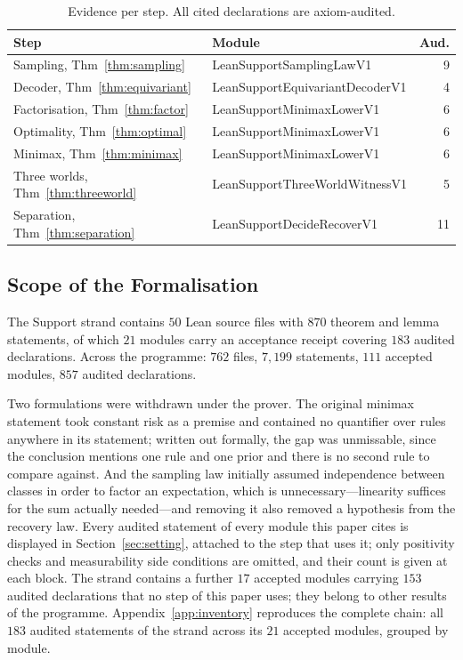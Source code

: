 \documentclass[conference]{IEEEtran}
\theoremstyle{definition}
\newcommand{\lean}[1]{\textsf{\footnotesize #1}}
\begin{document}
\begin{table}[htbp]
\caption{Evidence per step. All cited declarations are axiom-audited.}
\label{tab:inventory}
\centering\footnotesize\setlength{\tabcolsep}{3pt}
\begin{tabular}{@{}llr@{}}
\toprule
Step & Module & Aud. \\
\midrule
Sampling, Thm~\ref{thm:sampling}      & \lean{LeanSupportSamplingLawV1}        & 9 \\
Decoder, Thm~\ref{thm:equivariant}    & \lean{LeanSupportEquivariantDecoderV1} & 4 \\
Factorisation, Thm~\ref{thm:factor}   & \lean{LeanSupportMinimaxLowerV1}       & 6 \\
Optimality, Thm~\ref{thm:optimal}     & \lean{LeanSupportMinimaxLowerV1}       & 6 \\
Minimax, Thm~\ref{thm:minimax}        & \lean{LeanSupportMinimaxLowerV1}       & 6 \\
Three worlds, Thm~\ref{thm:threeworld}& \lean{LeanSupportThreeWorldWitnessV1}  & 5 \\
Separation, Thm~\ref{thm:separation}  & \lean{LeanSupportDecideRecoverV1}      & 11 \\
\bottomrule
\end{tabular}
\end{table}

\subsection{Scope of the Formalisation}

The Support strand contains $50$ Lean source files with $870$ theorem and lemma statements,
of which $21$ modules carry an acceptance receipt covering $183$ audited declarations. Across
the programme: $762$ files, $7{,}199$ statements, $111$ accepted modules, $857$ audited
declarations.

Two formulations were withdrawn under the prover. The original minimax statement took constant
risk as a premise and contained no quantifier over rules anywhere in its statement; written out
formally, the gap was unmissable, since the conclusion mentions one rule and one prior and
there is no second rule to compare against. And the sampling law initially assumed independence
between classes in order to factor an expectation, which is unnecessary---linearity suffices
for the sum actually needed---and removing it also removed a hypothesis from the recovery law.
Every audited statement of every module this paper cites is displayed in Section~\ref{sec:setting}, attached to the step that uses it; only positivity checks and measurability side conditions are omitted, and their count is given at each block. The strand contains a further $17$ accepted modules carrying $153$ audited declarations that no step of this paper uses; they belong to other results of the programme. Appendix~\ref{app:inventory} reproduces the complete chain: all $183$ audited statements of the strand across its $21$ accepted modules, grouped by module.
\end{document}
